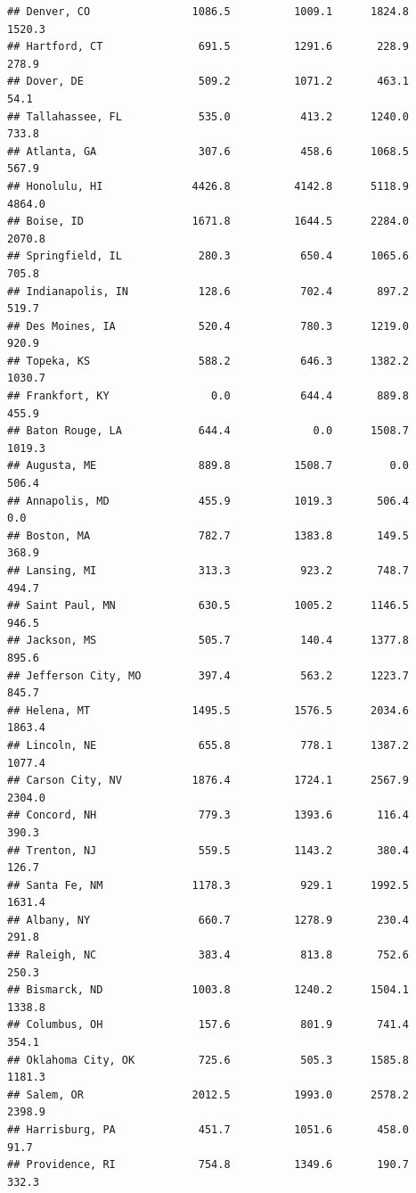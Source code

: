 \documentclass[
]{article}
\begin{document}
\begin{verbatim}
## Denver, CO                1086.5          1009.1      1824.8        1520.3
## Hartford, CT               691.5          1291.6       228.9         278.9
## Dover, DE                  509.2          1071.2       463.1          54.1
## Tallahassee, FL            535.0           413.2      1240.0         733.8
## Atlanta, GA                307.6           458.6      1068.5         567.9
## Honolulu, HI              4426.8          4142.8      5118.9        4864.0
## Boise, ID                 1671.8          1644.5      2284.0        2070.8
## Springfield, IL            280.3           650.4      1065.6         705.8
## Indianapolis, IN           128.6           702.4       897.2         519.7
## Des Moines, IA             520.4           780.3      1219.0         920.9
## Topeka, KS                 588.2           646.3      1382.2        1030.7
## Frankfort, KY                0.0           644.4       889.8         455.9
## Baton Rouge, LA            644.4             0.0      1508.7        1019.3
## Augusta, ME                889.8          1508.7         0.0         506.4
## Annapolis, MD              455.9          1019.3       506.4           0.0
## Boston, MA                 782.7          1383.8       149.5         368.9
## Lansing, MI                313.3           923.2       748.7         494.7
## Saint Paul, MN             630.5          1005.2      1146.5         946.5
## Jackson, MS                505.7           140.4      1377.8         895.6
## Jefferson City, MO         397.4           563.2      1223.7         845.7
## Helena, MT                1495.5          1576.5      2034.6        1863.4
## Lincoln, NE                655.8           778.1      1387.2        1077.4
## Carson City, NV           1876.4          1724.1      2567.9        2304.0
## Concord, NH                779.3          1393.6       116.4         390.3
## Trenton, NJ                559.5          1143.2       380.4         126.7
## Santa Fe, NM              1178.3           929.1      1992.5        1631.4
## Albany, NY                 660.7          1278.9       230.4         291.8
## Raleigh, NC                383.4           813.8       752.6         250.3
## Bismarck, ND              1003.8          1240.2      1504.1        1338.8
## Columbus, OH               157.6           801.9       741.4         354.1
## Oklahoma City, OK          725.6           505.3      1585.8        1181.3
## Salem, OR                 2012.5          1993.0      2578.2        2398.9
## Harrisburg, PA             451.7          1051.6       458.0          91.7
## Providence, RI             754.8          1349.6       190.7         332.3

\end{verbatim}
\end{document}
